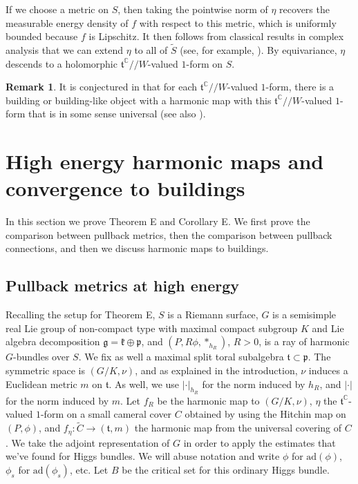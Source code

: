 \documentclass[10pt]{amsart}
\newcommand{\p}{\mathfrak{p}}
\newcommand{\g}{\mathfrak{g}}
\newcommand{\kk}{\mathfrak{k}}
\newcommand{\ft}{\mathfrak{t}}
\theoremstyle{definition}
\newtheorem{remark}[thm]{Remark}
\DeclareMathOperator{\C}{\mathbb{C}}
\begin{document}
If we choose a metric on $S$, then taking the pointwise norm of $\eta$ recovers the measurable energy density of $f$ with respect to this metric, which is uniformly bounded because $f$ is Lipschitz. It then follows from classical results in complex analysis that we can extend $\eta$ to all of $\tilde{S}$ (see, for example, \cite{Sha}). By equivariance, $\eta$ descends to a holomorphic $\ft^{\C}//W$-valued $1$-form on $S$.
\begin{remark}
    It is conjectured in \cite{KNPS} that for each $\ft^{\C}//W$-valued $1$-form, there is a building or building-like object with a harmonic map with this $\ft^{\C}//W$-valued $1$-form that is in some sense universal \cite[Conjecture 1.17]{KNPS} (see also \cite{KNPS2}).
\end{remark}


\section{High energy harmonic maps and convergence to buildings}
In this section we prove Theorem E and Corollary E. We first prove the comparison between pullback metrics, then the comparison between pullback connections, and then we discuss harmonic maps to buildings. 

\subsection{Pullback metrics at high energy}
Recalling the setup for Theorem E, $S$ is a Riemann surface, $G$ is a semisimple real Lie group of non-compact type with maximal compact subgroup $K$ and Lie algebra decomposition $\g=\kk\oplus \p$, and $(P,R\phi,*_{h_R})$, $R>0$, is a ray of harmonic $G$-bundles over $S$.  We fix as well a maximal split toral subalgebra $\ft\subset \p$. The symmetric space is $(G/K,\nu)$, and as explained in the introduction, $\nu$ induces a Euclidean metric $m$ on $\ft$. As well, we use $|\cdot|_{h_R}$ for the norm induced by $h_R$, and $|\cdot|$ for the norm induced by $m$. Let $f_R$ be the harmonic map to $(G/K,\nu)$, $\eta$ the $\ft^{\C}$-valued $1$-form on a small cameral cover $C$ obtained by using the Hitchin map on $(P,\phi)$, and $f_\eta:\tilde{C}\to (\ft,m)$ the harmonic map from the universal covering of $C$. We take the adjoint representation of $G$ in order to apply the estimates that we've found for Higgs bundles. We will abuse notation and write $\phi$ for $\textrm{ad}(\phi)$, $\phi_s$ for $\textrm{ad}(\phi_s)$, etc. Let $B$ be the critical set for this ordinary Higgs bundle. 
\end{document}
